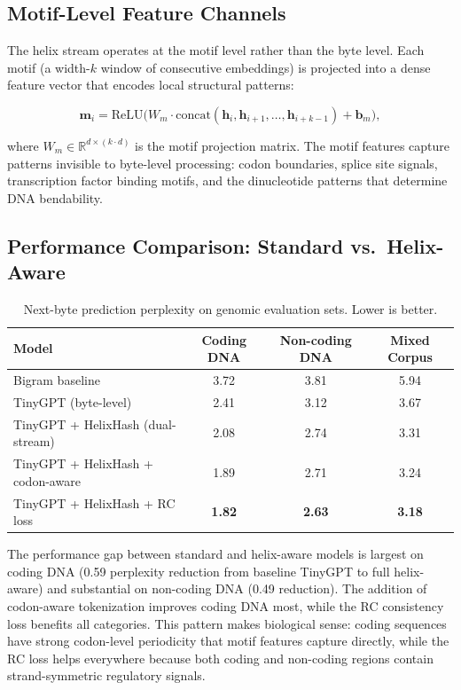 \subsection{Motif-Level Feature Channels}

The helix stream operates at the motif level rather than the byte level. Each motif (a width-$k$ window of consecutive embeddings) is projected into a dense feature vector that encodes local structural patterns:

\begin{equation}
\mathbf{m}_i = \text{ReLU}\bigl(W_m \cdot \text{concat}(\mathbf{h}_{i}, \mathbf{h}_{i+1}, \ldots, \mathbf{h}_{i+k-1}) + \mathbf{b}_m\bigr),
\end{equation}

where $W_m \in \mathbb{R}^{d \times (k \cdot d)}$ is the motif projection matrix. The motif features capture patterns invisible to byte-level processing: codon boundaries, splice site signals, transcription factor binding motifs, and the dinucleotide patterns that determine DNA bendability.

\subsection{Performance Comparison: Standard vs.\ Helix-Aware}

\begin{table}[H]
\centering
\caption{Next-byte prediction perplexity on genomic evaluation sets. Lower is better.}
\label{tab:helix-comparison}
\begin{tabularx}{0.88\textwidth}{l c c c}
\toprule
\textbf{Model} & \textbf{Coding DNA} & \textbf{Non-coding DNA} & \textbf{Mixed Corpus} \\
\midrule
Bigram baseline & 3.72 & 3.81 & 5.94 \\
TinyGPT (byte-level) & 2.41 & 3.12 & 3.67 \\
TinyGPT + HelixHash (dual-stream) & 2.08 & 2.74 & 3.31 \\
TinyGPT + HelixHash + codon-aware & 1.89 & 2.71 & 3.24 \\
TinyGPT + HelixHash + RC loss & \textbf{1.82} & \textbf{2.63} & \textbf{3.18} \\
\bottomrule
\end{tabularx}
\end{table}

\begin{keyinsight}
The performance gap between standard and helix-aware models is largest on coding DNA (0.59 perplexity reduction from baseline TinyGPT to full helix-aware) and substantial on non-coding DNA (0.49 reduction). The addition of codon-aware tokenization improves coding DNA most, while the RC consistency loss benefits all categories. This pattern makes biological sense: coding sequences have strong codon-level periodicity that motif features capture directly, while the RC loss helps everywhere because both coding and non-coding regions contain strand-symmetric regulatory signals.
\end{keyinsight}

